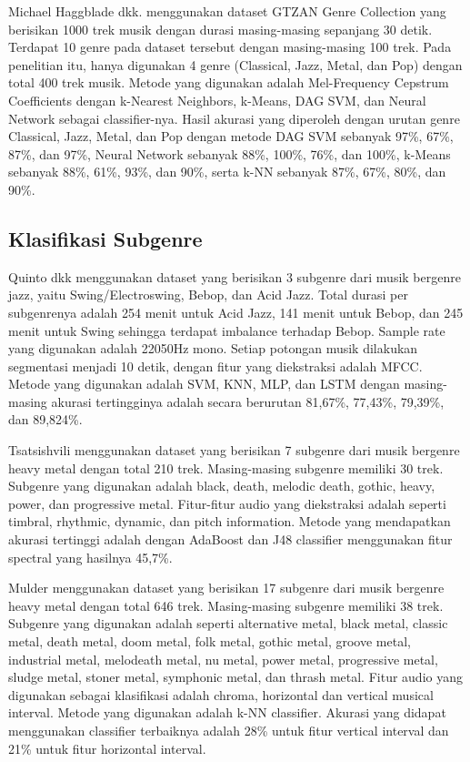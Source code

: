 Michael Haggblade dkk. \citep{Haggblade2011MusicGC} menggunakan dataset GTZAN Genre Collection yang berisikan 1000 trek musik dengan durasi masing-masing sepanjang 30 detik. Terdapat 10 genre pada dataset tersebut dengan masing-masing 100 trek. Pada penelitian itu, hanya digunakan 4 genre (Classical, Jazz, Metal, dan Pop) dengan total 400 trek musik. Metode yang digunakan adalah Mel-Frequency Cepstrum Coefficients dengan k-Nearest Neighbors, k-Means, DAG SVM, dan Neural Network sebagai classifier-nya. Hasil akurasi yang diperoleh dengan urutan genre Classical, Jazz, Metal, dan Pop dengan metode DAG SVM sebanyak 97\%, 67\%, 87\%, dan 97\%, Neural Network sebanyak 88\%, 100\%, 76\%, dan 100\%, k-Means sebanyak 88\%, 61\%, 93\%, dan 90\%, serta k-NN sebanyak 87\%, 67\%, 80\%, dan 90\%.

\subsection{Klasifikasi Subgenre}
Quinto dkk \citep{quinto} menggunakan dataset yang berisikan 3 subgenre dari musik bergenre jazz, yaitu Swing/Electroswing, Bebop, dan Acid Jazz. Total durasi per subgenrenya adalah 254 menit untuk Acid Jazz, 141 menit untuk Bebop, dan 245 menit untuk Swing sehingga terdapat imbalance terhadap Bebop. Sample rate yang digunakan adalah 22050Hz mono. Setiap potongan musik dilakukan segmentasi menjadi 10 detik, dengan fitur yang diekstraksi adalah MFCC. Metode yang digunakan adalah SVM, KNN, MLP, dan LSTM dengan masing-masing akurasi tertingginya adalah secara berurutan 81,67\%, 77,43\%, 79,39\%, dan 89,824\%.

Tsatsishvili \cite{tsatsishvili} menggunakan dataset yang berisikan 7 subgenre dari musik bergenre heavy metal dengan total 210 trek. Masing-masing subgenre memiliki 30 trek. Subgenre yang digunakan adalah black, death, melodic death, gothic, heavy, power, dan progressive metal. Fitur-fitur audio yang diekstraksi adalah seperti timbral, rhythmic, dynamic, dan pitch information. Metode yang mendapatkan akurasi tertinggi adalah dengan AdaBoost dan J48 classifier menggunakan fitur spectral yang hasilnya 45,7\%.

Mulder \citep{Mulder2014AutomaticCO}  menggunakan dataset yang berisikan 17 subgenre dari musik bergenre heavy metal dengan total 646 trek. Masing-masing subgenre memiliki 38 trek. Subgenre yang digunakan adalah seperti alternative metal, black metal, classic metal, death metal, doom metal, folk metal, gothic metal, groove metal, industrial metal, melodeath metal, nu metal, power metal, progressive metal, sludge metal, stoner metal, symphonic metal, dan thrash metal. Fitur audio yang digunakan sebagai klasifikasi adalah chroma, horizontal dan vertical musical interval. Metode yang digunakan adalah k-NN classifier. Akurasi yang didapat menggunakan classifier terbaiknya adalah 28\% untuk fitur vertical interval dan 21\% untuk fitur horizontal interval.

